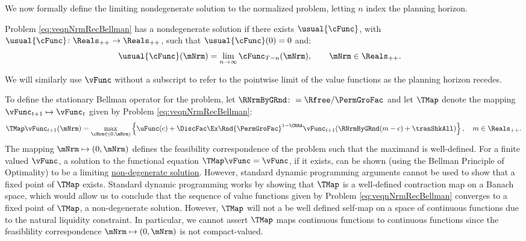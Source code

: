 \documentclass[BufferStockTheory]{subfiles}
\begin{document}

\hypertarget{sensible}{}\hypertarget{useful}{}
\hypertarget{Definition-of-a-Nondegenerate-Solution and Bellman}{}
We now formally define the limiting nondegenerate solution to the normalized problem, letting $n$ index the planning horizon.

\begin{definition}\label{def:nondegeneracy}
Problem \ref{eq:veqnNrmRecBellman} has a nondegenerate solution if there exists $ \usual{\cFunc}$, with $\usual{\cFunc}\colon \Reals_{++}\rightarrow \Reals_{++}$, such that $\usual{\cFunc}(0) = 0$ and:
%
\begin{align*}
  \usual{\cFunc}(\mNrm)  & =  \lim_{n \rightarrow \infty} \cFunc_{T-n}(\mNrm), \qquad \mNrm \in \Reals_{++} \notag.
\end{align*}
\end{definition}

We will similarly use $\vFunc$ without a subscript to refer to the pointwise limit of the value functions as the planning horizon recedes.


\hypertarget{Stationary-Bellman-Operator}{}

To define the stationary Bellman operator for the problem, let $\RNrmByGRnd \colon = \Rfree/\PermGroFac$ and let $\TMap$ denote the mapping $\vFunc_{t+1} \mapsto \vFunc_{t}$ given by Problem \ref{eq:veqnNrmRecBellman}:
%
\begin{equation}\label{eq:maintmap}
  \TMap \vFunc_{t+1}(\mNrm) = \max_{\cNrm \in (0, \mNrm) }  \left\{
    \uFunc(c) + \DiscFac\Ex\Rnd{\PermGroFac}^{1-\CRRA}\vFunc_{t+1}(\RNrmByGRnd(m - c) + \tranShkAll)
  \right\}, \quad m \in \Reals_{++}.  
\end{equation}
%
The mapping $\mNrm\mapsto (0, \mNrm)$ defines the feasibility correspondence of the problem such that the maximand is well-defined.
For a finite valued $\vFunc$, a solution to the functional equation $\TMap\vFunc = \vFunc$, if it exists, can be shown (using the Bellman Principle of Optimality) to be a limiting \hyperlink{sensible}{non-degenerate solution}.
However, standard dynamic programming arguments cannot be used to show that a fixed point of $\TMap$ exists.
Standard dynamic programming works by showing that $\TMap$ is a well-defined contraction map on a Banach space, which would allow us to conclude that the sequence of value functions given by Problem \ref{eq:veqnNrmRecBellman} converges to a fixed point of $\TMap$, a non-degenerate solution.
However, $\TMap$ will not a be well defined self-map on a space of continuous functions due to the natural liquidity constraint.
In particular, we cannot assert $\TMap$ maps continuous functions to continuous functions since the feasiblility correspondence $\mNrm\mapsto (0, \mNrm)$ is not compact-valued.
\end{document}
